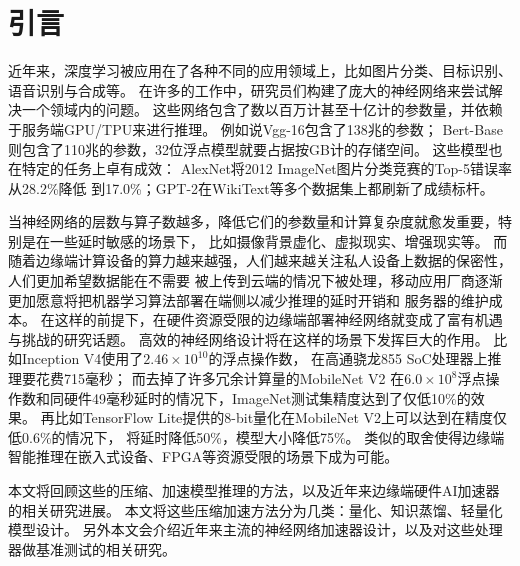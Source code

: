 \section{引言}
近年来，深度学习被应用在了各种不同的应用领域上，比如图片分类、目标识别、语音识别与合成等。
在许多的工作中，研究员们构建了庞大的神经网络来尝试解决一个领域内的问题。
这些网络包含了数以百万计甚至十亿计的参数量，并依赖于服务端GPU/TPU来进行推理。
例如说Vgg-16\cite{simonyan2014very}包含了138兆的参数；
Bert-Base\cite{devlin2018bert}则包含了110兆的参数，32位浮点模型就要占据按GB计的存储空间。
这些模型也在特定的任务上卓有成效：
AlexNet\cite{krizhevsky2012imagenet}将2012 ImageNet\cite{deng2009imagenet}图片分类竞赛的Top-5错误率从28.2\%降低
到17.0\%；GPT-2\cite{radford2019language}在WikiText等多个数据集上都刷新了成绩标杆。

当神经网络的层数与算子数越多，降低它们的参数量和计算复杂度就愈发重要，特别是在一些延时敏感的场景下，
比如摄像背景虚化、虚拟现实、增强现实等。
而随着边缘端计算设备的算力越来越强，人们越来越关注私人设备上数据的保密性，人们更加希望数据能在不需要
被上传到云端的情况下被处理，移动应用厂商逐渐更加愿意将把机器学习算法部署在端侧以减少推理的延时开销和
服务器的维护成本。
在这样的前提下，在硬件资源受限的边缘端部署神经网络就变成了富有机遇与挑战的研究话题。
高效的神经网络设计将在这样的场景下发挥巨大的作用。
比如Inception V4\cite{szegedy2017inception}使用了$2.46\times 10^{10}$的浮点操作数，
在高通骁龙855 SoC处理器上推理要花费715毫秒；
而去掉了许多冗余计算量的MobileNet V2\cite{sandler2018mobilenetv2}
在$6.0\times 10^8$浮点操作数和同硬件49毫秒延时的情况下，ImageNet测试集精度达到了仅低10\%的效果。
再比如TensorFlow Lite提供的8-bit量化在MobileNet V2上可以达到在精度仅低0.6\%的情况下，
将延时降低50\%，模型大小降低75\%。
类似的取舍使得边缘端智能推理在嵌入式设备、FPGA等资源受限的场景下成为可能。

本文将回顾这些的压缩、加速模型推理的方法，以及近年来边缘端硬件AI加速器的相关研究进展。
本文将这些压缩加速方法分为几类：量化、知识蒸馏、轻量化模型设计。
另外本文会介绍近年来主流的神经网络加速器设计，以及对这些处理器做基准测试的相关研究。